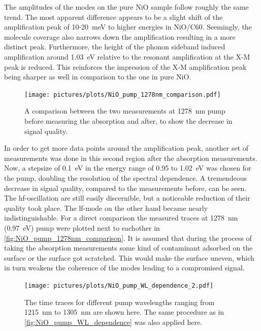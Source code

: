 The amplitudes of the modes on the pure NiO sample follow roughly the same trend.
The most apparent difference appears to be a slight shift of the amplification peak of 10-\qty{20}{meV} to higher energies in NiO/C60.
Seemingly, the molecule coverage also narrows down the amplification resulting in a more distinct peak.
Furthermore, the height of the phonon sideband induced amplification around \qty{1.03}{eV} relative to the resonant amplification at the X-M peak is reduced.
This reinforces the impression of the X-M amplification peak being sharper as well in comparison to the one in pure NiO.

\begin{figure}[ht]
    \centering
    \texttt{[image: pictures/plots/NiO\_pump\_1278nm\_comparison.pdf]}
    \caption{A comparison between the two measurements at \qty{1278}{nm} pump before measuring the absorption and after, to show the decrease in signal quality.}
    \label{fig:NiO_pump_1278nm_comparison}
\end{figure}
In order to get more data points around the amplification peak, another set of measurements was done in this second region after the absorption measurements.
Now, a stepsize of \qty{0.1}{eV} in the energy range of 0.95 to \qty{1.02}{eV} was chosen for the pump, doubling the resolution of the spectral dependence.
A tremendeous decrease in signal quality, compared to the measurements before, can be seen.
The hf-oscillation are still easily discernible, but a noticeable reduction of their quality took place.
The lf-mode on the other hand became nearly indistinguishable.
For a direct comparison the measured traces at \qty{1278}{nm} (\qty{0.97}{eV}) pump were plotted next to eachother in \autoref{fig:NiO_pump_1278nm_comparison}.
It is assumed that during the process of taking the absorption measurements some kind of contaminant adsorbed on the surface or the surface got scratched.
This would make the surface uneven, which in turn weakens the coherence of the modes leading to a compromised signal.
\begin{figure}[ht]
    \centering
    \texttt{[image: pictures/plots/NiO\_pump\_WL\_dependence\_2.pdf]}
    \caption{The time traces for different pump wavelengths ranging from \qty{1215}{nm} to \qty{1305}{nm} are shown here. The same procedure as in \autoref{fig:NiO_pump_WL_dependence} was also applied here.}
    \label{fig:NiO_pump_WL_dependence_2}
\end{figure}

